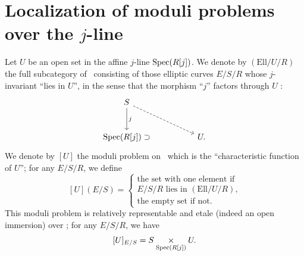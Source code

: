 \section{Localization of moduli problems over the $j$-line}
\label{sec:8.3}

\kmitem\label{item:8.3.1}
Let $U$ be an open set in the affine $j$-line $\operatorname{Spec}(R[j])$. We denote by $(\mathrm{Ell}/U/R)$ the full subcategory of \EllR\ consisting of those elliptic curves $E/S/R$ whose $j$-invariant ``lies in $U$'', in the sense that the morphism ``$j$'' factors through $U$ :
\begin{equation}\label{eq:8.3.1.1}
\begin{tikzcd}[column sep=huge, row sep=large]
S \arrow[d, "j"] \arrow[rd, dashed] & \\
\Spec(R[j]) \supset & U .
\end{tikzcd}
\end{equation}
We denote by $[U]$ the moduli problem on \EllR\ which is the ``characteristic function of $U$''; for any $E/S/R$, we define
\begin{equation}\label{eq:8.3.1.2}
[U](E/S) = \left\{
\begin{array}{l}
\text{the set with one element if} \\
\text{$E/S/R$ lies in $(\mathrm{Ell}/U/R)$,} \\
\text{the empty set if not.}
\end{array}
\right.
\end{equation}
This moduli problem is relatively representable and etale (indeed an open immersion) over \EllR; for any $E/S/R$, we have
\begin{equation}\label{eq:8.3.1.3}
[U]_{E/S} = S \underset{\operatorname{Spec}(R[j])}{\times} U .
\end{equation}

